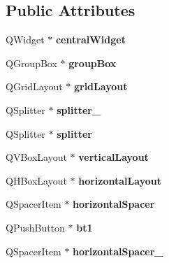 \subsection*{Public Attributes}
\begin{DoxyCompactItemize}
\item 
\mbox{\label{class_ui__main__app_ad0202c9cb8cd2502dc7360af726e5a75}} 
Q\+Widget $\ast$ {\bfseries central\+Widget}
\item 
\mbox{\label{class_ui__main__app_a3b4f56c1226e951beff82a9df894a702}} 
Q\+Group\+Box $\ast$ {\bfseries group\+Box}
\item 
\mbox{\label{class_ui__main__app_afaad9988821fe51d5c2499ba8c3d5bc8}} 
Q\+Grid\+Layout $\ast$ {\bfseries grid\+Layout}
\item 
\mbox{\label{class_ui__main__app_a09acc4cc448203da7788cb4b8ecf535a}} 
Q\+Splitter $\ast$ {\bfseries splitter\+\_}
\item 
\mbox{\label{class_ui__main__app_a9874cbd82ffc2109838dcfc15e2c1c11}} 
Q\+Splitter $\ast$ {\bfseries splitter}
\item 
\mbox{\label{class_ui__main__app_ae0f65c1e84ec7e180c716d0f94ba585b}} 
Q\+V\+Box\+Layout $\ast$ {\bfseries vertical\+Layout}
\item 
\mbox{\label{class_ui__main__app_a4c398d3f558796098c18ed9b0a4555a4}} 
Q\+H\+Box\+Layout $\ast$ {\bfseries horizontal\+Layout}
\item 
\mbox{\label{class_ui__main__app_a4f61194d4fecb8561691eff11b7fa006}} 
Q\+Spacer\+Item $\ast$ {\bfseries horizontal\+Spacer}
\item 
\mbox{\label{class_ui__main__app_adaf025a98367c473970ba45ac71bece5}} 
Q\+Push\+Button $\ast$ {\bfseries bt1}
\item 
\mbox{\label{class_ui__main__app_a0315ac6c4177ec97e76c0f692aa9024f}} 
Q\+Spacer\+Item $\ast$ {\bfseries horizontal\+Spacer\+\_}
\item 

\end{DoxyCompactItemize}

